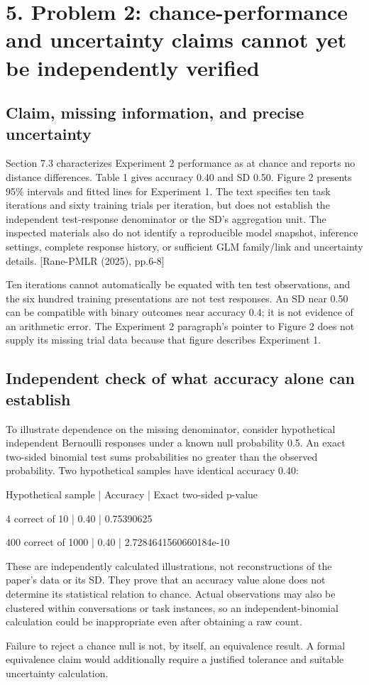 \documentclass[10pt]{article}
\begin{document}
\section*{5. Problem 2: chance-performance and uncertainty claims cannot yet be independently verified}
\subsection*{Claim, missing information, and precise uncertainty}
Section 7.3 characterizes Experiment 2 performance as at chance and reports no distance differences. Table 1 gives accuracy 0.40 and SD 0.50. Figure 2 presents 95\% intervals and fitted lines for Experiment 1. The text specifies ten task iterations and sixty training trials per iteration, but does not establish the independent test-response denominator or the SD’s aggregation unit. The inspected materials also do not identify a reproducible model snapshot, inference settings, complete response history, or sufficient GLM family/link and uncertainty details. [Rane-PMLR (2025), pp.6-8]\par
Ten iterations cannot automatically be equated with ten test observations, and the six hundred training presentations are not test responses. An SD near 0.50 can be compatible with binary outcomes near accuracy 0.4; it is not evidence of an arithmetic error. The Experiment 2 paragraph’s pointer to Figure 2 does not supply its missing trial data because that figure describes Experiment 1.\par
\subsection*{Independent check of what accuracy alone can establish}
To illustrate dependence on the missing denominator, consider hypothetical independent Bernoulli responses under a known null probability 0.5. An exact two-sided binomial test sums probabilities no greater than the observed probability. Two hypothetical samples have identical accuracy 0.40:\par
Hypothetical sample | Accuracy | Exact two-sided p-value\par
4 correct of 10 | 0.40 | 0.75390625\par
400 correct of 1000 | 0.40 | 2.7284641560660184e-10\par
These are independently calculated illustrations, not reconstructions of the paper’s data or its SD. They prove that an accuracy value alone does not determine its statistical relation to chance. Actual observations may also be clustered within conversations or task instances, so an independent-binomial calculation could be inappropriate even after obtaining a raw count.\par
Failure to reject a chance null is not, by itself, an equivalence result. A formal equivalence claim would additionally require a justified tolerance and suitable uncertainty calculation.\par
\end{document}
